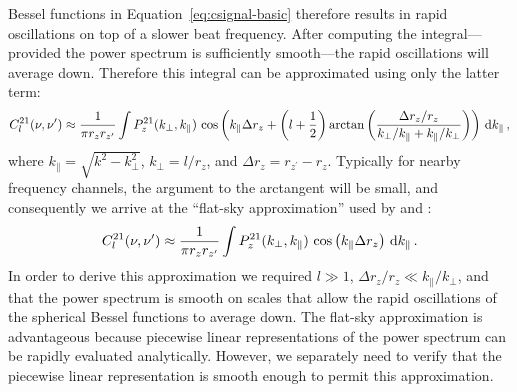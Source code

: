\documentclass[twocolumn]{aastex62}
\renewcommand{\d}{{\rm d}}
\begin{document}
Bessel functions in Equation~\ref{eq:csignal-basic} therefore results in rapid oscillations on top
of a slower beat frequency. After computing the integral---provided the power spectrum is
sufficiently smooth---the rapid oscillations will average down. Therefore this integral can be
approximated using only the latter term:
\begin{equation}\label{eq:csignal-beats}
    C^{21}_l(\nu, \nu^\prime) \approx
        \frac{1}{\pi r_z r_{z^\prime}}
        \int
        P_z^{21}(k_\perp, k_\parallel) \,
        \cos\left(
            k_\parallel \Delta r_z
            + \left(l+\frac{1}{2}\right) \arctan\left(
                \frac{\Delta r_z/r_z}{k_\perp/k_\parallel+k_\parallel/k_\perp}
            \right)
        \right)
        \, \d k_\parallel\,,
\end{equation}
where $k_\parallel = \sqrt{k^2 - k_\perp^2}$, $k_\perp = l/r_z$, and $\Delta r_z = r_{z^\prime} -
r_z$. Typically for nearby frequency channels, the argument to the arctangent will be small, and
consequently we arrive at the ``flat-sky approximation'' used by \citet{2005MNRAS.356.1519B} and
\citet{2007MNRAS.378..119D}:
\begin{equation}
    C^{21}_l(\nu, \nu^\prime) \approx
        \frac{1}{\pi r_z r_{z^\prime}}
        \int
        P_z^{21}(k_\perp, k_\parallel) \,
        \cos\left(k_\parallel \Delta r_z\right)
        \, \d k_\parallel\,.
\end{equation}
In order to derive this approximation we required $l\gg 1$, $\Delta r_z/r_z \ll
k_\parallel/k_\perp$, and that the power spectrum is smooth on scales that allow the rapid
oscillations of the spherical Bessel functions to average down.  The flat-sky approximation is
advantageous because piecewise linear representations of the power spectrum can be rapidly evaluated
analytically. However, we separately need to verify that the piecewise linear representation is
smooth enough to permit this approximation.



\end{document}
